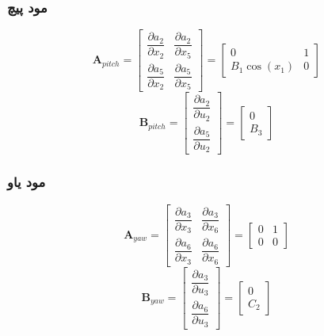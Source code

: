 \subsubsection{مود پیچ}
\begin{equation}
	\boldsymbol A_{pitch} = \begin{bmatrix}
		\dfrac{\partial  a_2}{\partial  x_2}& \dfrac{\partial  a_2}{\partial  x_5}
		\\[1em]
		\dfrac{\partial  a_5}{\partial  x_2}& \dfrac{\partial  a_5}{\partial  x_5}
	\end{bmatrix} = 
	\begin{bmatrix}
		0 & 1\\
		B_1\cos(x_1) & 0
	\end{bmatrix}
\end{equation}
\begin{equation}
	\boldsymbol B_{pitch} = \begin{bmatrix}
		\dfrac{\partial  a_2}{\partial  u_2}
		\\[1em]
		\dfrac{\partial  a_5}{\partial  u_2}
	\end{bmatrix} = 
	\begin{bmatrix}
		0\\
		B_3
	\end{bmatrix}
\end{equation}
\subsubsection{مود یاو}
\begin{equation}
	\boldsymbol A_{yaw} = \begin{bmatrix}
		\dfrac{\partial  a_3}{\partial  x_3}& \dfrac{\partial  a_3}{\partial  x_6}
		\\[1em]
		\dfrac{\partial  a_6}{\partial  x_3}& \dfrac{\partial  a_6}{\partial  x_6}
	\end{bmatrix} = 
	\begin{bmatrix}
		0 & 1\\
		0 & 0
	\end{bmatrix}
\end{equation}
\begin{equation}
	\boldsymbol B_{yaw} = \begin{bmatrix}
		\dfrac{\partial  a_3}{\partial  u_3}
		\\[1em]
		\dfrac{\partial  a_6}{\partial  u_3}
	\end{bmatrix} = 
	\begin{bmatrix}
		0\\
		C_2
	\end{bmatrix}
\end{equation}
